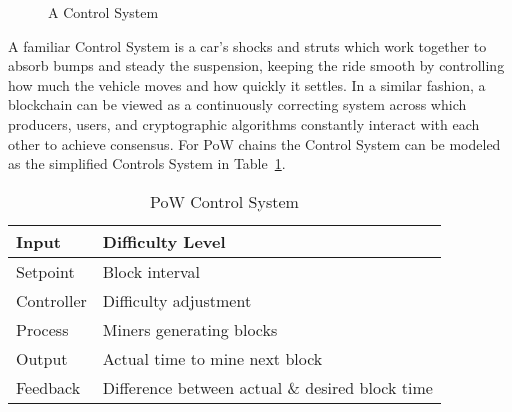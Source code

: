 \documentclass{article}
\begin{document}
\begin{figure}[h]
  \centering
  \caption{A Control System}
  \label{fig:control_system}
\end{figure}

A familiar Control System is a car’s shocks and struts which work together to
absorb bumps and steady the suspension, keeping the ride smooth by controlling
how much the vehicle moves and how quickly it settles. In a similar fashion, a
blockchain can be viewed as a continuously correcting system across which
producers, users, and cryptographic algorithms constantly interact with each
other to achieve consensus. For PoW chains the Control System can be modeled as
the simplified Controls System in Table~\ref{fig:pow_control_system}.

{
\renewcommand{\arraystretch}{1.5}
\begin{table}[h]
  \centering
  \begin{tabular}{|>{\RaggedRight\arraybackslash}l|>{\RaggedRight\arraybackslash}p{10cm}|}
    \hline
    Input      & Difficulty Level                                \\
    \hline
    Setpoint   & Block interval                                  \\
    \hline
    Controller & Difficulty adjustment                           \\
    \hline
    Process    & Miners generating blocks                        \\
    \hline
    Output     & Actual time to mine next block                  \\
    \hline
    Feedback   & Difference between actual \& desired block time \\
    \hline
  \end{tabular}
  \caption{PoW Control System}
  \label{fig:pow_control_system}
\end{table}
}
\end{document}
